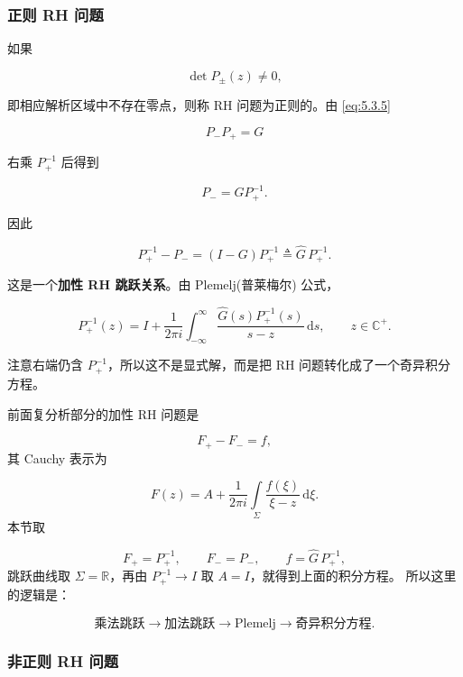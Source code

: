 \documentclass[
    lang=cn,
    scheme=chinese,
    mode=simple,
    device=normal,
    color=blue,
    math=cm,
    thmcnt=section,
    12pt,
    nowatermark
]{elegantbook}
\begin{document}
\subsubsection{正则 RH 问题}

如果

\begin{equation}
    \det P_\pm(z)\ne0,
    \tag{5.3.10}
    \label{eq:5.3.10}
\end{equation}

即相应解析区域中不存在零点，则称 RH 问题为正则的。由 \eqref{eq:5.3.5}

\[
    P_-P_+=G
\]

右乘 $P_+^{-1}$ 后得到

\[
    P_-=GP_+^{-1}.
\]

因此

\[
    P_+^{-1}-P_-
    =
    (I-G)P_+^{-1}
    \triangleq
    \widehat G\,P_+^{-1}.
\]

这是一个\textbf{加性 RH 跳跃关系}。由 Plemelj(普莱梅尔) 公式，

\[
    P_+^{-1}(z)
    =
    I+
    \dfrac{1}{2\pi i}
    \int_{-\infty}^{\infty}
    \dfrac{\widehat G(s)P_+^{-1}(s)}{s-z}\,\mathrm ds,
    \qquad
    z\in\mathbb{C}^+.
\]

注意右端仍含 $P_+^{-1}$，所以这不是显式解，而是把 RH 问题转化成了一个奇异积分方程。

\begin{callout}
    前面复分析部分的加性 RH 问题是

    \[
        F_+-F_-=f,
    \]
    其 Cauchy 表示为

    \[
        F(z)
        =
        A+
        \dfrac{1}{2\pi i}
        \int\limits_\Sigma
        \dfrac{f(\xi)}{\xi-z}\,\mathrm d\xi.
    \]
    本节取

    \[
        F_+=P_+^{-1},
        \qquad
        F_-=P_-,
        \qquad
        f=\widehat G\,P_+^{-1},
    \]
    跳跃曲线取 $\Sigma=\mathbb{R}$，再由 $P_+^{-1}\to I$ 取 $A=I$，就得到上面的积分方程。
    所以这里的逻辑是：

    \[
        \text{乘法跳跃}
        \longrightarrow
        \text{加法跳跃}
        \longrightarrow
        \text{Plemelj}
        \longrightarrow
        \text{奇异积分方程}.
    \]

\end{callout}

\subsubsection{非正则 RH 问题}
\end{document}
